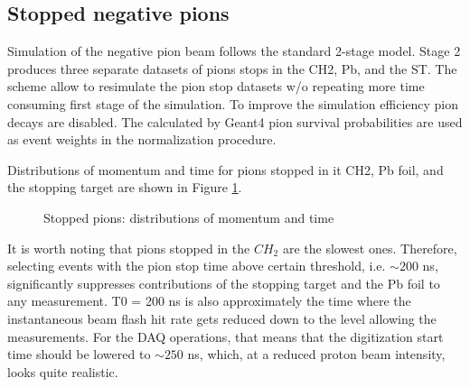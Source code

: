 \subsection{Stopped negative pions}

Simulation of the negative pion beam follows the standard 2-stage model.
Stage 2 produces three separate datasets of pions stops in the CH2, Pb, and the ST.
The scheme allow to resimulate the pion stop datasets w/o repeating more time consuming
first stage of the simulation.
To improve the simulation efficiency pion decays are disabled. The calculated by Geant4
pion survival probabilities are used as event weights in the normalization procedure.

Distributions of momentum and time for pions stopped in it CH2, Pb foil, and the
stopping target are shown in Figure \ref{figure:stopped_pim_mom_time}.

\begin{figure}[H]
  \caption{
    \label{figure:stopped_pim_mom_time}
    Stopped pions: distributions of momentum and time
  }
\end{figure}

It is worth noting that pions stopped in the $CH_2$ are the slowest ones.
Therefore, selecting events with the pion stop time above certain threshold, i.e. $\sim 200$ ns, 
significantly suppresses contributions of the stopping target and the Pb foil to any measurement.
T0 = 200 ns is also approximately the time where the instantaneous beam flash
hit rate gets reduced down to the level allowing the measurements. For the DAQ operations,
that means that the digitization start time should be lowered to $\sim 250$ ns,
which, at a reduced proton beam intensity, looks quite realistic.

